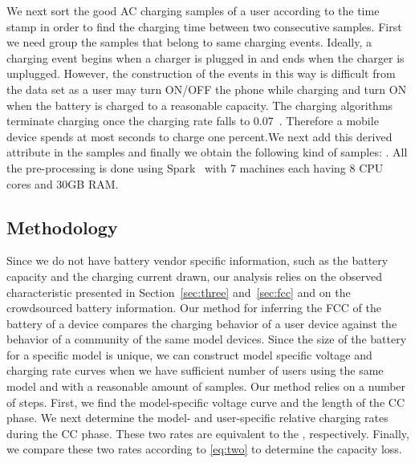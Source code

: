 \documentclass[journal]{IEEEtran}
\begin{document}
We next sort the good AC charging samples of a user according to the time stamp in order to find the charging time between two consecutive samples. First we need group the samples that belong to same charging events. Ideally, a charging event begins when a charger is plugged in and ends when the charger is unplugged. However, the construction of the events in this way is difficult from the data set as a user may turn ON/OFF the phone while charging and turn ON when the battery is charged to a reasonable capacity. The charging algorithms terminate charging once the charging rate falls to 0.07~\cite{Thanh:2012}. Therefore a mobile device spends at most  seconds to charge one percent.We next add this derived attribute in the samples and finally we obtain the following kind of samples: . All the pre-processing is done using Spark~\cite{Zaharia2010} with 7 machines each having 8 CPU cores and 30GB RAM. 



















\subsection{Methodology}
\label{sub:methodology}

Since we do not have battery vendor specific information, such as the battery capacity and the charging current drawn, our analysis relies on the observed characteristic presented in Section~\ref{sec:three} and~\ref{sec:fcc} and on the crowdsourced battery information.  Our method for inferring the FCC of the battery of a device compares the charging behavior of a user device against the behavior of a community of the same model devices.  Since the size of the battery for a specific model is unique, we can construct  model specific voltage and charging rate curves when we have sufficient number of users using  the same model and with a reasonable amount of samples. Our method relies on a number of steps. First, we find the model-specific voltage curve and the length of the CC phase. We next determine the model- and user-specific relative charging rates during the CC phase. These two rates are equivalent to the , respectively. Finally, we compare these two rates according to \eqref{eq:two} to determine the capacity loss. 
\end{document}
